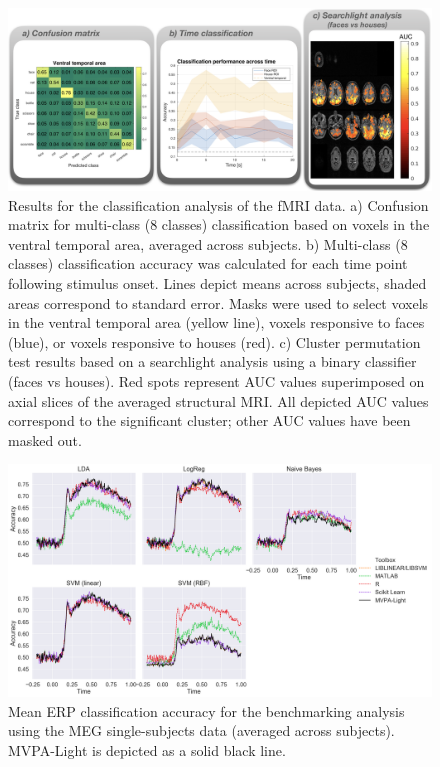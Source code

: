\documentclass[utf8]{frontiersSCNS} %
\begin{document}
\begin{figure}[ht!]
\centering\includegraphics[width=\linewidth]{fmri_results}
\caption{Results for the classification analysis of the \cite{Haxby2001} fMRI data. a) Confusion matrix for multi-class (8 classes) classification based on voxels in the ventral temporal area, averaged across subjects. b) Multi-class (8 classes) classification accuracy was calculated for each time point following stimulus onset. Lines depict  means across subjects, shaded areas correspond to standard error. Masks were used to select voxels in the ventral temporal area (yellow line), voxels responsive to faces (blue), or voxels responsive to houses (red). c) Cluster permutation test results based on a searchlight analysis using a binary classifier (faces vs houses). Red spots represent AUC values superimposed on axial slices of the averaged structural MRI. All depicted AUC values correspond to the significant cluster; other AUC values have been masked out. }\label{fig:fmri_results}
\end{figure}

\begin{figure}[ht!]
\centering\includegraphics[width=\linewidth]{benchmark_classification}
\caption{Mean ERP classification accuracy for the benchmarking analysis using the MEG single-subjects data (averaged across subjects). MVPA-Light is depicted as a solid black line.}\label{fig:benchmarking}
\end{figure}

\end{document}
